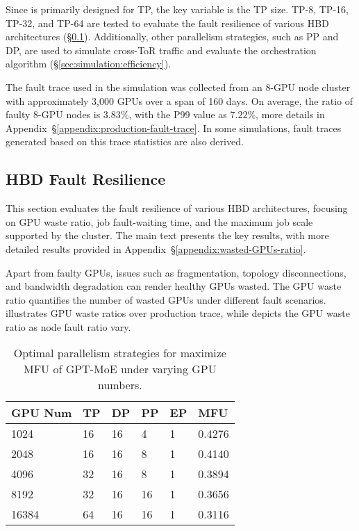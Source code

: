 Since \sys is primarily designed for TP, the key variable is the TP size. TP-8, TP-16, TP-32, and TP-64 are tested to evaluate the fault resilience of various HBD architectures (\S\ref{sec:simulation:fault}).
Additionally, other parallelism strategies, such as PP and DP, are used to simulate cross-ToR traffic and evaluate the orchestration algorithm (\S\ref{sec:simulation:efficiency}).


 The fault trace used in the simulation was collected from an 8-GPU node cluster with approximately 3,000 GPUs over a span of 160 days.
On average, the ratio of faulty 8-GPU nodes is $3.83\%$, with the P99 value as $7.22\%$, more details in Appendix~\S\ref{appendix:production-fault-trace}. In some simulations, fault traces generated based on this trace statistics are also derived. 

\subsection{HBD Fault Resilience}
\label{sec:simulation:fault}

This section evaluates the fault resilience of various HBD architectures, focusing on GPU waste ratio, job fault-waiting time, and the maximum job scale supported by the cluster. The main text presents the key results, with more detailed results provided in Appendix~\S\ref{appendix:wasted-GPUs-ratio}.



Apart from faulty GPUs, issues such as fragmentation, topology disconnections, and bandwidth degradation can render healthy GPUs wasted.
The GPU waste ratio quantifies the number of wasted GPUs under different fault scenarios.  illustrates GPU waste ratios over production trace, while  depicts the GPU waste ratio as node fault ratio vary.

\begin{table}[h!t] \footnotesize
    \vspace{-1ex}
    \centering
    \begin{tabular}{llllll}
    \toprule
    \textbf{GPU Num} & \textbf{TP} & \textbf{DP} & \textbf{PP} & \textbf{EP} & \textbf{MFU} \\
    \midrule
    1024    & 16       & 16      & 4       & 1       & 0.4276         \\
    2048    & 16      & 16      & 8        & 1       & 0.4140        \\
    4096    & 32      & 16      & 8        & 1       & 0.3894        \\
    8192    & 32      & 16      & 16      & 1       & 0.3656       \\
    16384  &  64     & 16       & 16      & 1      & 0.3116       \\
    \bottomrule
    \end{tabular}
    \caption{Optimal parallelism strategies for maximize MFU of GPT-MoE under varying GPU numbers.}
    \vspace{-3em}
    \label{tab:eval:gpt-moe-optimal}
\end{table}


